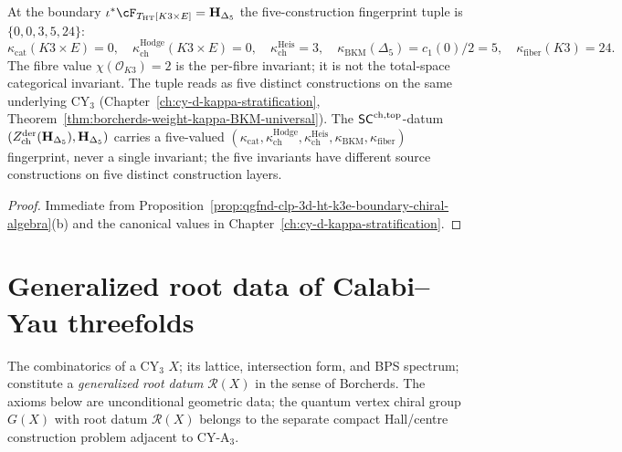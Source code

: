 \begin{corollary}
\label{cor:qgfnd-clp-k3e-kappa-fingerprint}
At the boundary $\iota^*\cF_{T_{\mathrm{HT}}[K3\times E]}=\HDelta$
the five-construction fingerprint tuple is $\{0,0,3,5,24\}$:
\[
 \kappa_{\mathrm{cat}}(K3\times E)=0,\quad
 \kappa_{\mathrm{ch}}^{\mathrm{Hodge}}(K3\times E)=0,\quad
 \kappa_{\mathrm{ch}}^{\mathrm{Heis}}=3,\quad
 \kappa_{\mathrm{BKM}}(\Delta_5)=c_1(0)/2=5,\quad
 \kappa_{\mathrm{fiber}}(K3)=24.
\]
The fibre value $\chi(\mathcal O_{K3})=2$ is the per-fibre invariant; it is not the
total-space categorical invariant. The tuple reads as five distinct
constructions on the same underlying
CY$_3$ (Chapter~\ref{ch:cy-d-kappa-stratification},
Theorem~\ref{thm:borcherds-weight-kappa-BKM-universal}). The
$\mathsf{SC}^{\mathrm{ch,top}}$-datum $(Z^{\mathrm{der}}_{\mathrm{ch}}(\mathbf{H}_{\Delta_5}),\mathbf{H}_{\Delta_5})$
carries a five-valued $(\kappa_{\mathrm{cat}}, \kappa_{\mathrm{ch}}^{\mathrm{Hodge}},
\kappa_{\mathrm{ch}}^{\mathrm{Heis}}, \kappa_{\mathrm{BKM}}, \kappa_{\mathrm{fiber}})$
fingerprint, never a single invariant; the five invariants have different
source constructions on five distinct construction layers.
\end{corollary}

\begin{proof}
Immediate from
Proposition~\ref{prop:qgfnd-clp-3d-ht-k3e-boundary-chiral-algebra}(b)
and the canonical values in
Chapter~\ref{ch:cy-d-kappa-stratification}.
\end{proof}

\section{Generalized root data of Calabi--Yau threefolds}
\label{sec:thy-grd-main}

The combinatorics of a CY$_3$ $X$; its lattice, intersection form, and BPS
spectrum; constitute a \emph{generalized root datum} $\mathcal{R}(X)$ in
the sense of Borcherds. The axioms below are unconditional geometric data;
the quantum vertex chiral group $G(X)$ with root datum $\mathcal{R}(X)$
belongs to the separate compact Hall/centre construction problem adjacent
to CY-A$_3$.


